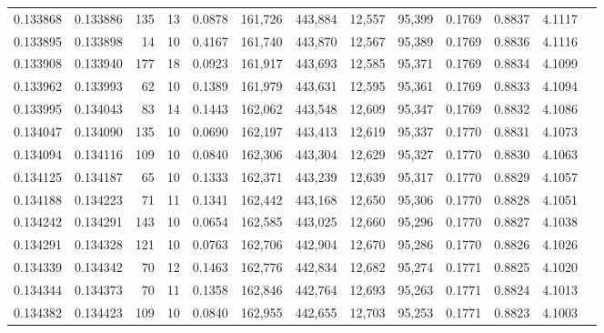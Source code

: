 \begin{tabular}{rrrrrrrrrrrrr}
0.133868 & 0.133886 &   135 &  13 &                                     0.0878 & 161,726 & 443,884 &  12,557 &  95,399 & 0.1769 & 0.8837 & 4.1117 \\
0.133895 & 0.133898 &    14 &  10 &                                     0.4167 & 161,740 & 443,870 &  12,567 &  95,389 & 0.1769 & 0.8836 & 4.1116 \\
0.133908 & 0.133940 &   177 &  18 &                                     0.0923 & 161,917 & 443,693 &  12,585 &  95,371 & 0.1769 & 0.8834 & 4.1099 \\
0.133962 & 0.133993 &    62 &  10 &                                     0.1389 & 161,979 & 443,631 &  12,595 &  95,361 & 0.1769 & 0.8833 & 4.1094 \\
0.133995 & 0.134043 &    83 &  14 &                                     0.1443 & 162,062 & 443,548 &  12,609 &  95,347 & 0.1769 & 0.8832 & 4.1086 \\
0.134047 & 0.134090 &   135 &  10 &                                     0.0690 & 162,197 & 443,413 &  12,619 &  95,337 & 0.1770 & 0.8831 & 4.1073 \\
0.134094 & 0.134116 &   109 &  10 &                                     0.0840 & 162,306 & 443,304 &  12,629 &  95,327 & 0.1770 & 0.8830 & 4.1063 \\
0.134125 & 0.134187 &    65 &  10 &                                     0.1333 & 162,371 & 443,239 &  12,639 &  95,317 & 0.1770 & 0.8829 & 4.1057 \\
0.134188 & 0.134223 &    71 &  11 &                                     0.1341 & 162,442 & 443,168 &  12,650 &  95,306 & 0.1770 & 0.8828 & 4.1051 \\
0.134242 & 0.134291 &   143 &  10 &                                     0.0654 & 162,585 & 443,025 &  12,660 &  95,296 & 0.1770 & 0.8827 & 4.1038 \\
0.134291 & 0.134328 &   121 &  10 &                                     0.0763 & 162,706 & 442,904 &  12,670 &  95,286 & 0.1770 & 0.8826 & 4.1026 \\
0.134339 & 0.134342 &    70 &  12 &                                     0.1463 & 162,776 & 442,834 &  12,682 &  95,274 & 0.1771 & 0.8825 & 4.1020 \\
0.134344 & 0.134373 &    70 &  11 &                                     0.1358 & 162,846 & 442,764 &  12,693 &  95,263 & 0.1771 & 0.8824 & 4.1013 \\
0.134382 & 0.134423 &   109 &  10 &                                     0.0840 & 162,955 & 442,655 &  12,703 &  95,253 & 0.1771 & 0.8823 & 4.1003 \\

\end{tabular}
